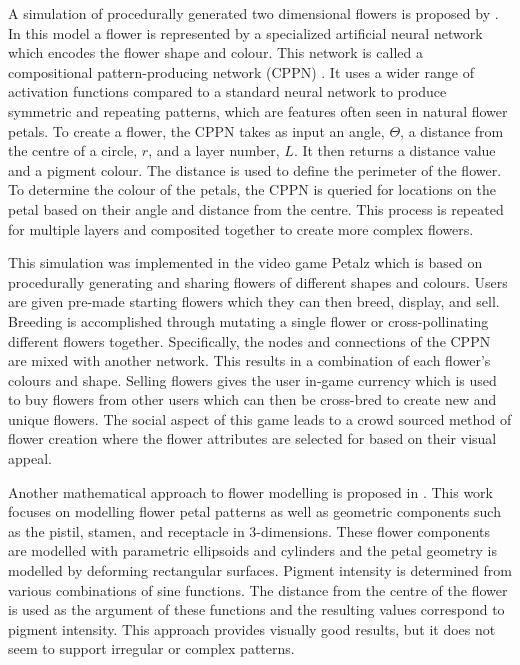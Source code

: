 A simulation of procedurally generated two dimensional flowers is proposed by \citep{risi2012}. In this model a flower is represented by a specialized artificial neural network which encodes the flower shape and colour. This network is called a compositional pattern-producing network (CPPN) \citep{stanley2007}. It uses a wider range of activation functions compared to a standard neural network to produce symmetric and repeating patterns, which are features often seen in natural flower petals. To create a flower, the CPPN takes as input an angle, $\Theta$, a distance from the centre of a circle, $r$, and a layer number, $L$. It then returns a distance value and a pigment colour. The distance is used to define the perimeter of the flower. To determine the colour of the petals, the CPPN is queried for locations on the petal based on their angle and distance from the centre. This process is repeated for multiple layers and composited together to create more complex flowers. 

This simulation was implemented in the video game Petalz which is based on procedurally generating and sharing flowers of different shapes and colours. Users are given pre-made starting flowers which they can then breed, display, and sell. Breeding is accomplished through mutating a single flower or cross-pollinating different flowers together. Specifically, the nodes and connections of the CPPN are mixed with another network. This results in a combination of each flower's colours and shape. Selling flowers gives the user in-game currency which is used to buy flowers from other users which can then be cross-bred to create new and unique flowers. The social aspect of this game leads to a crowd sourced method of flower creation where the flower attributes are selected for based on their visual appeal.

Another mathematical approach to flower modelling is proposed in \citep{lu2014}. This work focuses on modelling flower petal patterns as well as geometric components such as the pistil, stamen, and receptacle in 3-dimensions. These flower components are modelled with parametric ellipsoids and cylinders and the petal geometry is modelled by deforming rectangular surfaces. Pigment intensity is determined from various combinations of sine functions. The distance from the centre of the flower is used as the argument of these functions and the resulting values correspond to pigment intensity. This approach provides visually good results, but it does not seem to support irregular or complex patterns.

